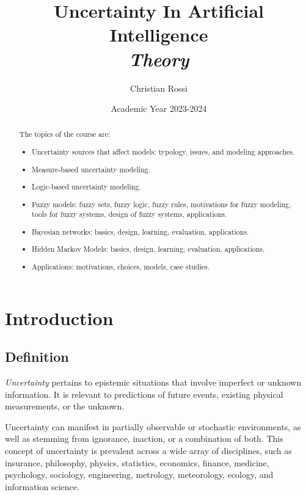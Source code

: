 \documentclass[12pt, a4paper]{report}
\title{Uncertainty In Artificial Intelligence \\ \textit{Theory}}
\author{Christian Rossi}
\date{Academic Year 2023-2024}
\begin{document}
\maketitle

\newpage

\begin{abstract}
    The topics of the course are:
    \begin{itemize}
        \item Uncertainty sources that affect models: typology, issues, and modeling approaches.
        \item Measure-based uncertainty modeling.
        \item Logic-based uncertainty modeling.
        \item Fuzzy models: fuzzy sets, fuzzy logic, fuzzy rules, motivations for fuzzy modeling, tools for fuzzy systems, design 
            of fuzzy systems, applications.
        \item Bayesian networks: basics, design, learning, evaluation, applications.
        \item Hidden Markov Models: basics, design, learning, evaluation, applications.
        \item Applications: motivations, choices, models, case studies.
    \end{itemize}
\end{abstract}

\newpage

\tableofcontents

\newpage

\chapter{Introduction}
    \section{Definition}
    \begin{definition}
        \emph{Uncertainty} pertains to epistemic situations that involve imperfect or unknown information. 
        It is relevant to predictions of future events, existing physical measurements, or the unknown.
    \end{definition}
    Uncertainty can manifest in partially observable or stochastic environments, as well as stemming from ignorance, inaction, or a combination of both. 
    This concept of uncertainty is prevalent across a wide array of disciplines, such as insurance, philosophy, physics, statistics, economics, finance, medicine, psychology, sociology, engineering, metrology, meteorology, ecology, and information science.
    
\end{document}
